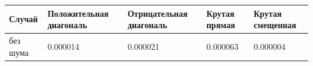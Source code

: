\begin{tabular}{|l|l|l|l|l|}
\hline
Случай & Положительная диагональ & Отрицательная диагональ & Крутая прямая & Крутая смещенная \\
\hline
без шума & 0.000014 & 0.000021 & 0.000063 & 0.000004 \\
\hline
\end{tabular}
